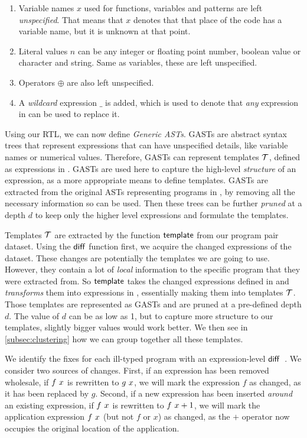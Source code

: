 \begin{enumerate}
    \item Variable names $x$ used for functions, variables and patterns are left
    \emph{unspecified}. That means that $x$ denotes that that place of the code
    has a variable name, but it is unknown at that point.
    \item Literal values $n$ can be any integer or floating point number,
    boolean value or character and string. Same as variables, these are left
    unspecified.
    \item Operators $\oplus$ are also left unspecified.
    \item A \emph{wildcard} expression $\_$ is added, which is used to denote
    that \emph{any} expression in \repairLang can be used to replace it.
\end{enumerate}

Using our RTL, we can now define \emph{Generic ASTs}. GASTs are abstract syntax
trees that represent expressions that can have unspecified details, like
variable names or numerical values. Therefore, GASTs can represent templates
$\mathcal{T}$, defined as expressions in \repairLang. GASTs are used here to capture the
high-level \emph{structure} of an expression, as a more appropriate means to
define templates. GASTs are extracted from the original ASTs representing
programs in \lang, by removing all the necessary information so \repairLang can
be used. Then these trees can be further \emph{pruned} at a depth $d$ to keep
only the higher level expressions and formulate the templates.


Templates $\mathcal{T}$ are extracted by the function $\mathsf{template}$ from our program
pair dataset. Using the $\mathsf{diff}$ function first, we acquire the changed
expressions of the dataset. These changes are potentially the templates we are
going to use. However, they contain a lot of \emph{local} information to the
specific program that they were extracted from. So $\mathsf{template}$ takes the
changed expressions defined in \lang and \emph{transforms} them into expressions
in \repairLang, essentially making them into templates $\mathcal{T}$. Those templates are
represented as GASTs and are pruned at a pre-defined depth $d$. The value of $d$
can be as low as 1, but to capture more structure to our templates, slightly
bigger values would work better. We then see in \autoref{subsec:clustering} how
we can group together all these templates.

We identify the fixes for each ill-typed program with an expression-level
$\mathsf{diff}$~\citep{Lempsink2009-xf}. We consider two sources of changes. First,
if an expression has been removed wholesale, \eg if $f\ x$ is rewritten
to $g\ x$, we will mark the expression $f$ as changed, as it has been
replaced by $g$. Second, if a new expression has been inserted \emph{around} an
existing expression, \eg if $f\ x$ is rewritten to
$f\ x + 1$, we will mark the application expression $f\ x$
(but not $f$ or $x$) as changed, as the $+$ operator now occupies the original
location of the application.

